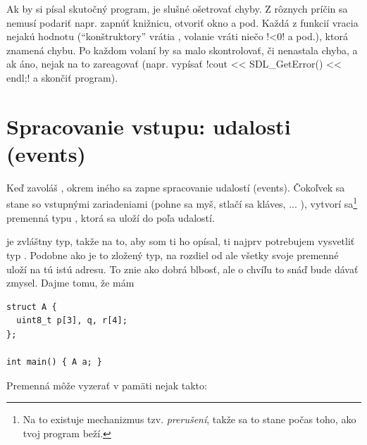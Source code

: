 Ak by si písal skutočný program, je slušné ošetrovať chyby. Z rôznych príčin sa nemusí podariť napr. zapnúť knižnicu, otvoriť okno a pod. Každá z funkcií vracia nejakú hodnotu
(``konštruktory'' vrátia , volanie  vráti niečo \prg!<0! a pod.), ktorá znamená chybu. Po každom volaní by sa malo skontrolovať, či nenastala chyba,
a ak áno, nejak na to zareagovať (napr. vypísať \prg!cout << SDL_GetError() << endl;! a skončiť program). 

\section*{Spracovanie vstupu: udalosti (events)}

Keď zavoláš , okrem iného sa zapne spracovanie udalostí (events). Čokoľvek sa stane so vstupnými zariadeniami (pohne sa myš, stlačí sa kláves, ... ), 
vytvorí sa\footnote{Na to existuje mechanizmus tzv. {\em prerušení}, takže sa to stane počas toho, ako tvoj program beží.}
premenná typu , ktorá sa uloží do poľa udalostí. 

 je zvláštny typ, takže na to, aby som ti ho opísal, ti najprv potrebujem  vysvetliť typ . Podobne ako  je to zložený typ,
na rozdiel od  ale   všetky svoje premenné uloží na tú istú adresu. To znie ako dobrá blbosť, ale o chvíľu to snáď bude dávať zmysel.
Dajme tomu, že mám\\

\begin{lstlisting}
struct A {
  uint8_t p[3], q, r[4];
};

int main() { A a; }
\end{lstlisting}

Premenná  môže vyzerať v pamäti nejak takto:\\
  \def\var#1#2#3{%
    \draw[#3] decorate[
       decoration={brace, amplitude=2ex}]{
       (#1,1.8) -- (#1+8,1.8) node [align=center,midway,anchor=south,yshift=2ex] {\vb{#2}}
        };
   \draw[#3,thick] (#1,0) rectangle (#1+8,1.5);
  }

  \def\varf#1#2#3{%
    \draw[#3] decorate[
       decoration={brace, amplitude=2ex}]{
       (#1,1.8) -- (#1+16,1.8) node [align=center,midway,anchor=south,yshift=2ex] {\vb{#2}}
        };
   \draw[#3,thick] (#1,0) rectangle (#1+16,1.5);
  }

